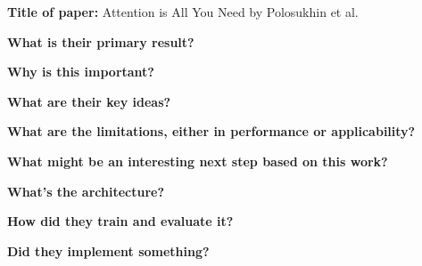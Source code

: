 \noindent \textbf{\large Title of paper: } Attention is All You Need by
Polosukhin et al.

\noindent\textbf{\large What is their primary result?}

\noindent\textbf{\large Why is this important?}

\noindent\textbf{\large What are their key ideas?}

\noindent\textbf{\large What are the limitations, either in performance or applicability?}

\noindent\textbf{\large What might be an interesting next step based on this work?}

\noindent\textbf{\large What's the architecture?}

\noindent\textbf{\large How did they train and evaluate it?}

\noindent\textbf{\large Did they implement something?}

